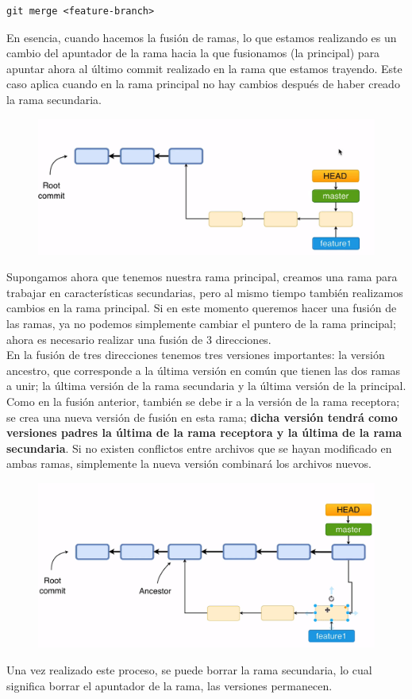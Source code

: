 \begin{verbatim}
git merge <feature-branch>
\end{verbatim}
En esencia, cuando hacemos la fusión de ramas, lo que estamos realizando es un cambio del apuntador de la rama hacia la que fusionamos (la principal) para apuntar ahora al último commit realizado en la rama que estamos trayendo. Este caso aplica cuando en la rama principal no hay cambios después de haber creado la rama secundaria.\\
\begin{figure}[H]
    \centering
    \includegraphics[scale=0.5]{Github/Git_f7.png}
\end{figure}
Supongamos ahora que tenemos nuestra rama principal, creamos una rama para trabajar en características secundarias, pero al mismo tiempo también realizamos cambios en la rama principal. Si en este momento queremos hacer una fusión de las ramas, ya no podemos simplemente cambiar el puntero de la rama principal; ahora es necesario realizar una fusión de 3 direcciones. \\
En la fusión de tres direcciones tenemos tres versiones importantes: la versión ancestro, que corresponde a la última versión en común que tienen las dos ramas a unir; la última versión de la rama secundaria y la última versión de la principal.
Como en la fusión anterior, también se debe ir a la versión de la rama receptora; se crea una nueva versión de fusión en esta rama; \textbf{dicha versión tendrá como versiones padres la última de la rama receptora y la última de la rama secundaria}. Si no existen conflictos entre archivos que se hayan modificado en ambas ramas, simplemente la nueva versión combinará los archivos nuevos.\\

\begin{figure}[H]
    \centering
    \includegraphics[scale=0.3]{Github/Git_f8.png}
\end{figure}
Una vez realizado este proceso, se puede borrar la rama secundaria, lo cual significa borrar el apuntador de la rama, las versiones permanecen. 

